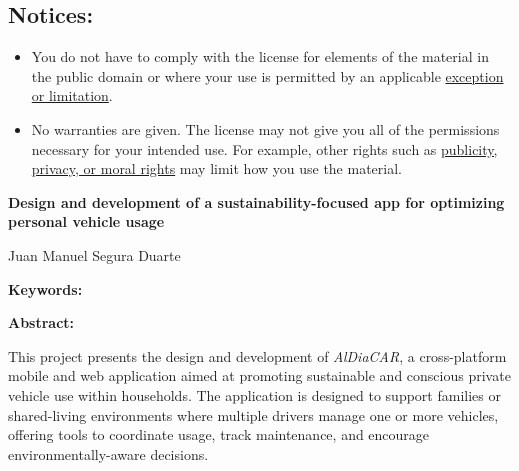 \begin{tcolorbox}
\vspace{-4mm} %
\section*{\scriptsize\bfseries Notices:}
\vspace{-\baselineskip} %
\begin{itemize}[itemsep=1pt,leftmargin=18pt,partopsep=0pt]
    \item You do not have to comply with the license for elements of the material in the public domain or where your use is permitted by an applicable \href{https://creativecommons.org/licenses/by/3.0/#ref-exception-or-limitation}{exception or limitation}.
    \item No warranties are given. The license may not give you all of the permissions necessary for your intended use. For example, other rights such as \href{https://creativecommons.org/licenses/by/3.0/#ref-publicity-privacy-or-moral-rights}{publicity, privacy, or moral rights} may limit how you use the material.
\end{itemize}
\end{tcolorbox}
\restoregeometry

\clearpage
\thispagestyle{empty}
\mbox{}
\newpage


\clearpage
\thispagestyle{empty}
\mbox{}
\newpage


\thispagestyle{empty}
\begin{center}
    {\large\bfseries Design and development of a sustainability-focused app for optimizing personal vehicle usage}
\end{center}
\begin{center}
    Juan Manuel Segura Duarte
\end{center}

\begin{flushleft}
    \textbf{Keywords:}
\end{flushleft}

\begin{flushleft}
    \textbf{Abstract:}
\end{flushleft}


This project presents the design and development of \textit{AlDiaCAR}, a cross-platform mobile and web application aimed at promoting sustainable and conscious private vehicle use within households. The application is designed to support families or shared-living environments where multiple drivers manage one or more vehicles, offering tools to coordinate usage, track maintenance, and encourage environmentally-aware decisions.

